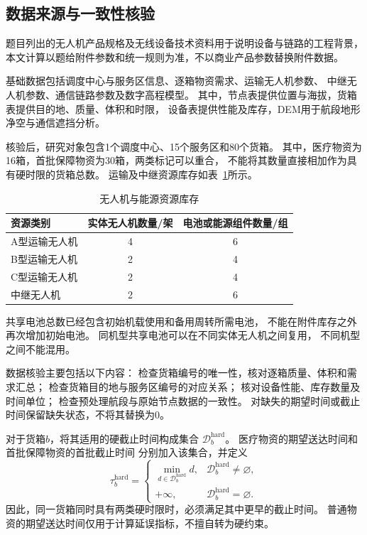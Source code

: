\documentclass[bwprint]{gmcmthesis}
\begin{document}
\subsection{数据来源与一致性核验}
题目列出的无人机产品规格及无线设备技术资料\cite{dji350,doodle}用于说明设备与链路的工程背景，本文计算以题给附件参数和统一规则为准，不以商业产品参数替换附件数据。


基础数据包括调度中心与服务区信息、逐箱物资需求、运输无人机参数、
中继无人机参数、通信链路参数及数字高程模型。
其中，节点表提供位置与海拔，货箱表提供目的地、质量、体积和时限，
设备表提供性能及库存，DEM用于航段地形净空与通信遮挡分析。

核验后，研究对象包含1个调度中心、15个服务区和80个货箱。
其中，医疗物资为16箱，首批保障物资为30箱，两类标记可以重合，
不能将其数量直接相加作为具有硬时限的货箱总数。
运输及中继资源库存如表~\ref{tab:resource_inventory}所示。

\begin{table}[htbp]
    \centering
    \caption{无人机与能源资源库存}
    \label{tab:resource_inventory}
    \begin{tabular}{lcc}
        \toprule
        资源类别 & 实体无人机数量/架 & 电池或能源组件数量/组 \\
        \midrule
        A型运输无人机 & 4 & 6 \\
        B型运输无人机 & 2 & 4 \\
        C型运输无人机 & 2 & 4 \\
        中继无人机   & 2 & 6 \\
        \bottomrule
    \end{tabular}
\end{table}

共享电池总数已经包含初始机载使用和备用周转所需电池，
不能在附件库存之外再次增加初始电池。
同机型共享电池可以在不同实体无人机之间复用，
不同机型之间不能混用。

数据核验主要包括以下内容：
检查货箱编号的唯一性，核对逐箱质量、体积和需求汇总；
检查货箱目的地与服务区编号的对应关系；
核对设备性能、库存数量及时间单位；
检查预处理航段与原始节点数据的一致性。
对缺失的期望时间或截止时间保留缺失状态，不将其替换为0。

对于货箱$b$，将其适用的硬截止时间构成集合
$\mathcal{D}_b^{\mathrm{hard}}$。
医疗物资的期望送达时间和首批保障物资的首批截止时间
分别加入该集合，并定义
\begin{equation}
    \tau_b^{\mathrm{hard}}
    =
    \begin{cases}
        \displaystyle
        \min_{d\in\mathcal{D}_b^{\mathrm{hard}}} d,
        & \mathcal{D}_b^{\mathrm{hard}}\neq\varnothing,\\[6pt]
        +\infty,
        & \mathcal{D}_b^{\mathrm{hard}}=\varnothing.
    \end{cases}
\end{equation}
因此，同一货箱同时具有两类硬时限时，必须满足其中更早的截止时间。
普通物资的期望送达时间仅用于计算延误指标，不擅自转为硬约束。
\end{document}

